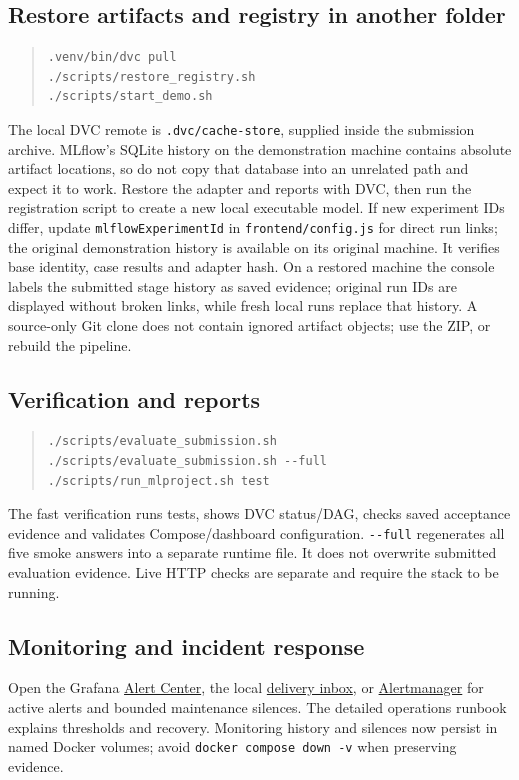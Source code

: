 \documentclass[11pt,a4paper]{article}
\begin{document}
\subsection*{Restore artifacts and registry in another folder}
\begin{quote}\small
\begin{verbatim}
.venv/bin/dvc pull
./scripts/restore_registry.sh
./scripts/start_demo.sh
\end{verbatim}
\end{quote}
The local DVC remote is \texttt{.\allowbreak{}dvc/\allowbreak{}cache-\allowbreak{}store}, supplied inside the submission archive. MLflow's SQLite history on the demonstration machine contains absolute artifact locations, so do not copy that database into an unrelated path and expect it to work. Restore the adapter and reports with DVC, then run the registration script to create a new local executable model. If new experiment IDs differ, update \texttt{mlflowExperimentId} in \texttt{frontend/\allowbreak{}config.\allowbreak{}js} for direct run links; the original demonstration history is available on its original machine. It verifies base identity, case results and adapter hash. On a restored machine the console labels the submitted stage history as saved evidence; original run IDs are displayed without broken links, while fresh local runs replace that history. A source-only Git clone does not contain ignored artifact objects; use the ZIP, or rebuild the pipeline.

\subsection*{Verification and reports}
\begin{quote}\small
\begin{verbatim}
./scripts/evaluate_submission.sh
./scripts/evaluate_submission.sh --full
./scripts/run_mlproject.sh test
\end{verbatim}
\end{quote}
The fast verification runs tests, shows DVC status/DAG, checks saved acceptance evidence and validates Compose/dashboard configuration. \texttt{-\allowbreak{}-\allowbreak{}full} regenerates all five smoke answers into a separate runtime file. It does not overwrite submitted evaluation evidence. Live HTTP checks are separate and require the stack to be running.

\subsection*{Monitoring and incident response}
Open the Grafana \href{http://localhost:13000/d/math-alert-center}{Alert Center}, the local \href{http://localhost:19199/}{delivery inbox}, or \href{http://localhost:19093/}{Alertmanager} for active alerts and bounded maintenance silences. The detailed operations runbook explains thresholds and recovery. Monitoring history and silences now persist in named Docker volumes; avoid \texttt{docker compose down -\allowbreak{}v} when preserving evidence.
\end{document}
